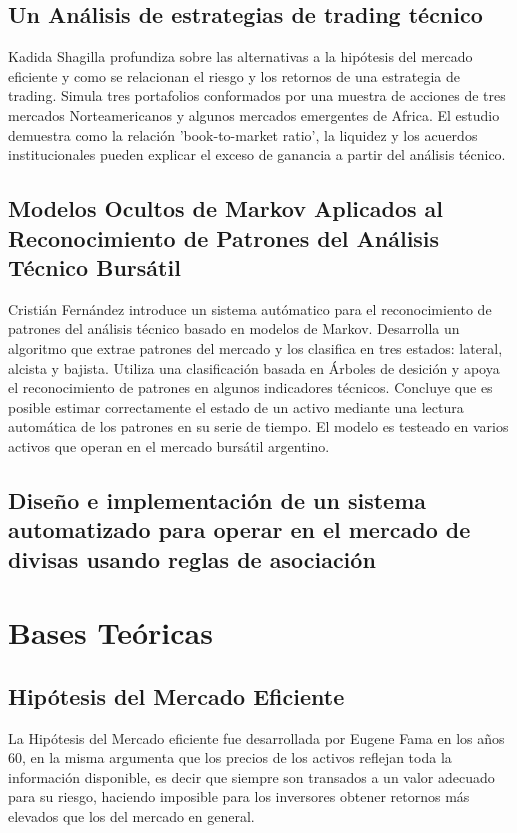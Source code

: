\documentclass[a4paper,12pt]{Latex/Classes/PhDthesisPSnPDF}
\begin{document}
\subsection{Un Análisis de estrategias de trading técnico}

Kadida Shagilla profundiza sobre las alternativas a la hipótesis del mercado eficiente y como se relacionan el riesgo y los retornos de una estrategia de trading. Simula tres portafolios conformados por una muestra de acciones de tres mercados Norteamericanos y algunos mercados emergentes de Africa. El estudio demuestra como la relación 'book-to-market ratio', la liquidez y los acuerdos institucionales pueden explicar el exceso de ganancia a partir del análisis técnico. 

\subsection{Modelos Ocultos de Markov Aplicados al Reconocimiento de Patrones del Análisis Técnico Bursátil}

Cristián Fernández introduce un sistema autómatico para el reconocimiento de patrones del análisis técnico basado en modelos de Markov. Desarrolla un algoritmo que extrae patrones del mercado y los clasifica en tres estados: lateral, alcista y bajista. Utiliza una clasificación basada en Árboles de desición y apoya el reconocimiento de patrones en algunos indicadores técnicos. Concluye que es posible estimar correctamente el estado de un activo mediante una lectura automática de los patrones en su serie de tiempo. El modelo es testeado en varios activos que operan en el mercado bursátil argentino.

\subsection{Diseño e implementación de un sistema automatizado para operar en el mercado de divisas usando reglas de asociación}



\section{Bases Teóricas}


\subsection{Hipótesis del Mercado Eficiente}

La Hipótesis del Mercado eficiente fue desarrollada por Eugene Fama en los años 60, en la misma argumenta que los precios de los activos reflejan toda la información disponible, es decir que siempre son transados a un valor adecuado para su riesgo, haciendo imposible para los inversores obtener retornos más elevados que los del mercado en general. 
\end{document}
